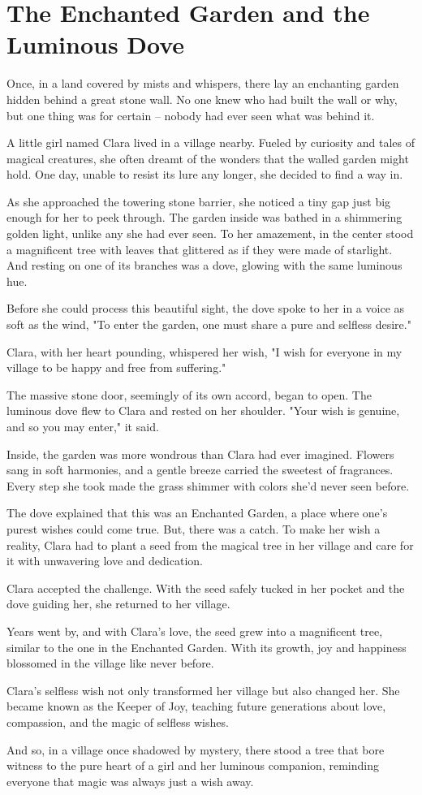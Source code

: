\documentclass{article}
\begin{document}
\section{The Enchanted Garden and the Luminous Dove}

Once, in a land covered by mists and whispers, there lay an enchanting garden hidden behind a great stone wall. No one knew who had built the wall or why, but one thing was for certain – nobody had ever seen what was behind it.

A little girl named Clara lived in a village nearby. Fueled by curiosity and tales of magical creatures, she often dreamt of the wonders that the walled garden might hold. One day, unable to resist its lure any longer, she decided to find a way in.

As she approached the towering stone barrier, she noticed a tiny gap just big enough for her to peek through. The garden inside was bathed in a shimmering golden light, unlike any she had ever seen. To her amazement, in the center stood a magnificent tree with leaves that glittered as if they were made of starlight. And resting on one of its branches was a dove, glowing with the same luminous hue.

Before she could process this beautiful sight, the dove spoke to her in a voice as soft as the wind, "To enter the garden, one must share a pure and selfless desire."

Clara, with her heart pounding, whispered her wish, "I wish for everyone in my village to be happy and free from suffering."

The massive stone door, seemingly of its own accord, began to open. The luminous dove flew to Clara and rested on her shoulder. "Your wish is genuine, and so you may enter," it said.

Inside, the garden was more wondrous than Clara had ever imagined. Flowers sang in soft harmonies, and a gentle breeze carried the sweetest of fragrances. Every step she took made the grass shimmer with colors she'd never seen before.

The dove explained that this was an Enchanted Garden, a place where one’s purest wishes could come true. But, there was a catch. To make her wish a reality, Clara had to plant a seed from the magical tree in her village and care for it with unwavering love and dedication.

Clara accepted the challenge. With the seed safely tucked in her pocket and the dove guiding her, she returned to her village.

Years went by, and with Clara's love, the seed grew into a magnificent tree, similar to the one in the Enchanted Garden. With its growth, joy and happiness blossomed in the village like never before.

Clara's selfless wish not only transformed her village but also changed her. She became known as the Keeper of Joy, teaching future generations about love, compassion, and the magic of selfless wishes.

And so, in a village once shadowed by mystery, there stood a tree that bore witness to the pure heart of a girl and her luminous companion, reminding everyone that magic was always just a wish away.
\end{document}
